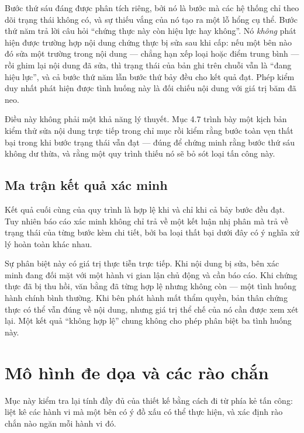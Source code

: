 Bước thứ sáu đáng được phân tích riêng, bởi nó là bước mà các hệ thống chỉ theo dõi trạng thái không có, và sự thiếu vắng của nó tạo ra một lỗ hổng cụ thể. Bước thứ năm trả lời câu hỏi {``}chứng thực này còn hiệu lực hay không{''}. Nó \emph{không} phát hiện được trường hợp nội dung chứng thực bị sửa sau khi cấp: nếu một bên nào đó sửa một trường trong nội dung --- chẳng hạn xếp loại hoặc điểm trung bình --- rồi ghim lại nội dung đã sửa, thì trạng thái của bản ghi trên chuỗi vẫn là {``}đang hiệu lực{''}, và cả bước thứ năm lẫn bước thứ bảy đều cho kết quả đạt. Phép kiểm duy nhất phát hiện được tình huống này là đối chiếu nội dung với giá trị băm đã neo.

Điều này không phải một khả năng lý thuyết. Mục 4.7 trình bày một kịch bản kiểm thử sửa nội dung trực tiếp trong chỉ mục rồi kiểm rằng bước toàn vẹn thất bại trong khi bước trạng thái vẫn đạt --- đúng để chứng minh rằng bước thứ sáu không dư thừa, và rằng một quy trình thiếu nó sẽ bỏ sót loại tấn công này.

\subsection{Ma trận kết quả xác minh}

Kết quả cuối cùng của quy trình là hợp lệ khi và chỉ khi cả bảy bước đều đạt. Tuy nhiên báo cáo xác minh không chỉ trả về một kết luận nhị phân mà trả về trạng thái của từng bước kèm chi tiết, bởi ba loại thất bại dưới đây có ý nghĩa xử lý hoàn toàn khác nhau.



Sự phân biệt này có giá trị thực tiễn trực tiếp. Khi nội dung bị sửa, bên xác minh đang đối mặt với một hành vi gian lận chủ động và cần báo cáo. Khi chứng thực đã bị thu hồi, văn bằng đã từng hợp lệ nhưng không còn --- một tình huống hành chính bình thường. Khi bên phát hành mất thẩm quyền, bản thân chứng thực có thể vẫn đúng về nội dung, nhưng giá trị thể chế của nó cần được xem xét lại. Một kết quả {``}không hợp lệ{''} chung không cho phép phân biệt ba tình huống này.

\section{Mô hình đe dọa và các rào chắn}

Mục này kiểm tra lại tính đầy đủ của thiết kế bằng cách đi từ phía kẻ tấn công: liệt kê các hành vi mà một bên có ý đồ xấu có thể thực hiện, và xác định rào chắn nào ngăn mỗi hành vi đó.

